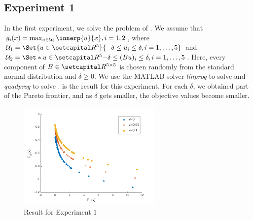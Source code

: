 \documentclass[../main]{subfiles}
\begin{document}
\subsection*{Experiment 1}
In the first experiment, we solve the problem of . We assume that $g_i(x) = \max_{u \in \mathcal{U}_i } \innerp{u}{x}, i = 1,2$, where $\mathcal{U}_1 = \Set{u \in \setR^5}{-\delta \leq u_i \leq \delta, i = 1,\dots,5 }$ and $\mathcal{U}_2 = \Set*{u \in \setR^5}{-\delta \leq (Bu)_i \leq \delta, i = 1,\dots,5 }$.
Here, every component of $B \in \setR^{5 \times 5}$ is chosen randomly from the standard normal distribution and $\delta \geq 0$. 
We use the MATLAB solver \emph{linprog} to solve  and \emph{quadprog} to solve .  is the result for this experiment. 
For each $\delta$, we obtained part of the Pareto frontier, and as $\delta$ gets smaller, the objective values become smaller.
\begin{figure}[htbp]
\centering
\includegraphics[clip, width = 7.0cm]{figs/linear_polyhedron_without_line_search}
\caption{Result for Experiment 1}
\end{figure}
\end{document}
